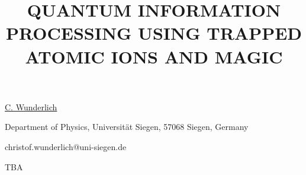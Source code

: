 \title{QUANTUM INFORMATION PROCESSING USING TRAPPED ATOMIC IONS AND MAGIC}

\underline{C. Wunderlich} 

{\normalsize{\vspace{-4mm}
Department of Physics, Universit\"{a}t Siegen, 57068 Siegen, Germany



\email christof.wunderlich@uni-siegen.de}}

TBA

\vspace{\baselineskip} 